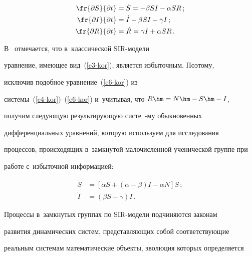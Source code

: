 \noindent


  \begin{align}


  \fr{\partial S}{\partial t} &= \dot{S}=-\beta S I -\alpha S R\,;\label{e4-kor}\\


  \fr{\partial I}{\partial t} &= \dot{I}- \beta SI -\gamma I\,;\label{e5-kor}\\


  \fr{\partial R}{\partial t} &= \dot{R} = \gamma I +\alpha SR\,.


  \label{e6-kor}


  \end{align}


  


  В~\cite[с.~160]{6-kor} отмечается, что в~классической SIR-мо\-де\-ли 


уравнение, име\-ющее вид~(\ref{e3-kor}), является избыточным. Поэтому, 


ис\-клю\-чив подобное уравнение~(\ref{e6-kor}) из  


сис\-те\-мы~(\ref{e4-kor})--(\ref{e6-kor}) и~учитывая, что $R\hm=N\hm- S\hm- I$, 


получим сле\-ду\-ющую результирующую сис\-те\ -му обыкновенных 


дифференциальных уравнений, которую используем для исследования 


процессов, происходящих в~замк\-ну\-той ма\-ло\-чис\-лен\-ной ученической группе при 


работе с~избыточной информацией: 


  \begin{align}


  \dot{S} &= \left[ \alpha S +(\alpha-\beta)I -\alpha N\right] S\,;\label{e7-kor}\\


  \dot{I} &= (\beta S-\gamma)I\,.


  \label{e8-kor}


  \end{align}


  


  Процессы в~замкнутых группах по SIR-мо\-де\-ли подчиняются законам 


развития динамических систем, представляющих собой со\-от\-вет\-ст\-ву\-ющие 


реальным сис\-те\-мам математические объекты, эволюция которых определяется 


